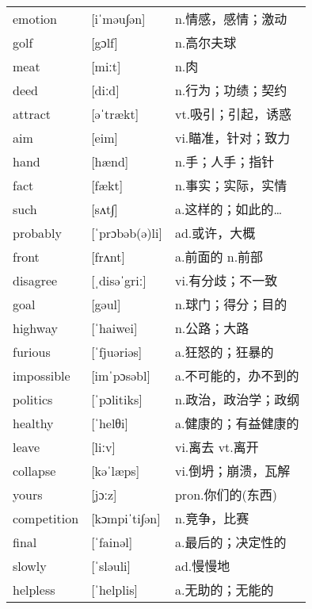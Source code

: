\documentclass[a4paper]{article}
\begin{document}
\section{}
\begin{tabular}{l l l}

emotion & [iˈməu∫ən] & n.情感，感情；激动 \\
golf & [gɔlf] & n.高尔夫球 \\
meat & [miːt] & n.肉 \\
deed & [diːd] & n.行为；功绩；契约 \\
attract & [əˈtrækt] & vt.吸引；引起，诱惑 \\
aim & [eim] & vi.瞄准，针对；致力 \\
hand & [hænd] & n.手；人手；指针 \\
fact & [fækt] & n.事实；实际，实情 \\
such & [sʌt∫] & a.这样的；如此的… \\
probably & [ˈprɔbəb(ə)li] & ad.或许，大概 \\
front & [frʌnt] & a.前面的 n.前部 \\
disagree & [ˌdisəˈgriː] & vi.有分歧；不一致 \\
goal & [gəul] & n.球门；得分；目的 \\
highway & [ˈhaiwei] & n.公路；大路 \\
furious & [ˈfjuəriəs] & a.狂怒的；狂暴的 \\
impossible & [imˈpɔsəbl] & a.不可能的，办不到的 \\
politics & [ˈpɔlitiks] & n.政治，政治学；政纲 \\
healthy & [ˈhelθi] & a.健康的；有益健康的 \\
leave & [liːv] & vi.离去 vt.离开 \\
collapse & [kəˈlæps] & vi.倒坍；崩溃，瓦解 \\
yours & [jɔːz] & pron.你们的(东西) \\
competition & [kɔmpiˈti∫ən] & n.竞争，比赛 \\
final & [ˈfainəl] & a.最后的；决定性的 \\
slowly & [ˈsləuli] & ad.慢慢地 \\
helpless & [ˈhelplis] & a.无助的；无能的 \\

\end{tabular}
\end{document}
